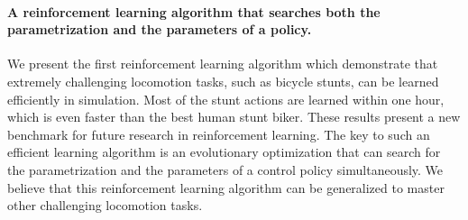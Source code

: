 \paragraph{A reinforcement learning algorithm that searches both the parametrization and the parameters of a policy.} We present the first reinforcement learning algorithm which demonstrate that extremely challenging locomotion tasks, such as bicycle stunts, can be learned efficiently in simulation. Most of the stunt actions are learned within one hour, which is even faster than the best human stunt biker. These results present a new benchmark for future research in reinforcement learning. The key to such an efficient learning algorithm is an evolutionary optimization that can search for the parametrization and the parameters of a control policy simultaneously. We believe that this reinforcement learning algorithm can be generalized to master other challenging locomotion tasks.

